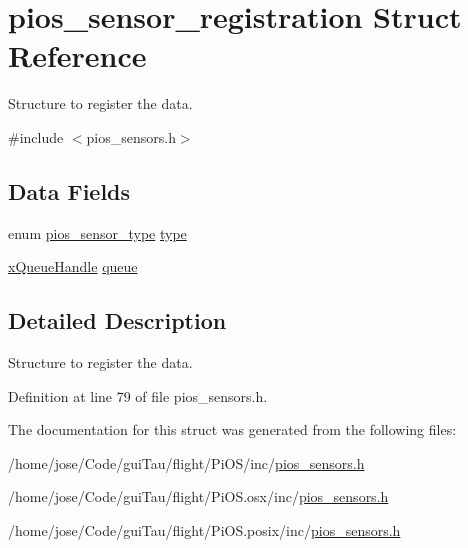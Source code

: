 \hypertarget{structpios__sensor__registration}{\section{pios\-\_\-sensor\-\_\-registration Struct Reference}
\label{structpios__sensor__registration}
}


Structure to register the data.  




{\ttfamily \#include $<$pios\-\_\-sensors.\-h$>$}

\subsection*{Data Fields}
\begin{DoxyCompactItemize}
\item 
enum \hyperlink{group___p_i_o_s___s_e_n_s_o_r_s_gadad1b67d985a6c9c150a70d23aac96a0}{pios\-\_\-sensor\-\_\-type} \hyperlink{group___p_i_o_s___s_e_n_s_o_r_s_gaf66f51be389998d910c8e9d3fc826a75}{type}
\item 
\hyperlink{_common_2_libraries_2_free_r_t_o_s_2_source_2include_2queue_8h_a229037f755b756156e34a440ce134b8b}{x\-Queue\-Handle} \hyperlink{group___p_i_o_s___s_e_n_s_o_r_s_gaeea1102e8510b8a5f3bb0cf298e7ebea}{queue}
\end{DoxyCompactItemize}


\subsection{Detailed Description}
Structure to register the data. 

Definition at line 79 of file pios\-\_\-sensors.\-h.



The documentation for this struct was generated from the following files\-:\begin{DoxyCompactItemize}
\item 
/home/jose/\-Code/gui\-Tau/flight/\-Pi\-O\-S/inc/\hyperlink{inc_2pios__sensors_8h}{pios\-\_\-sensors.\-h}\item 
/home/jose/\-Code/gui\-Tau/flight/\-Pi\-O\-S.\-osx/inc/\hyperlink{osx_2inc_2pios__sensors_8h}{pios\-\_\-sensors.\-h}\item 
/home/jose/\-Code/gui\-Tau/flight/\-Pi\-O\-S.\-posix/inc/\hyperlink{posix_2inc_2pios__sensors_8h}{pios\-\_\-sensors.\-h}\end{DoxyCompactItemize}
